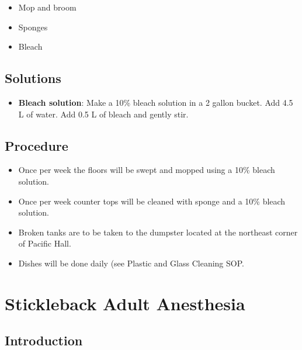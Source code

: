 \documentclass[
  letterpaper,
  DIV=11,
  numbers=noendperiod]{scrreprt}
\providecommand{\tightlist}{%
  \setlength{\itemsep}{0pt}\setlength{\parskip}{0pt}}\usepackage{longtable,booktabs,array}
\begin{document}
\begin{itemize}
\tightlist
\item
  Mop and broom
\item
  Sponges
\item
  Bleach
\end{itemize}

\hypertarget{solutions-33}{%
\section{Solutions}\label{solutions-33}}

\begin{itemize}
\tightlist
\item
  \textbf{Bleach solution}: Make a 10\% bleach solution in a 2 gallon
  bucket. Add 4.5 L of water. Add 0.5 L of bleach and gently stir.
\end{itemize}

\hypertarget{procedure-43}{%
\section{Procedure}\label{procedure-43}}

\begin{itemize}
\tightlist
\item
  Once per week the floors will be swept and mopped using a 10\% bleach
  solution.
\item
  Once per week counter tops will be cleaned with sponge and a 10\%
  bleach solution.
\item
  Broken tanks are to be taken to the dumpster located at the northeast
  corner of Pacific Hall.
\item
  Dishes will be done daily (see
  \protect\hypertarget{sec-husbandry-Plastic_Glassware_cleaning-bleach}{}{Plastic
  and Glass Cleaning SOP}.
\end{itemize}

\hypertarget{sec-husbandry-stickleback_adult_anesthisia}{%
\chapter{Stickleback Adult
Anesthesia}\label{sec-husbandry-stickleback_adult_anesthisia}}

\hypertarget{introduction-45}{%
\section{Introduction}\label{introduction-45}}
\end{document}
